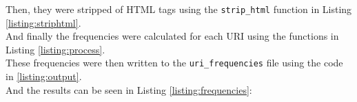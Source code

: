 \newpage

Then, they were stripped of HTML tags using the {\tt strip\_html} function in Listing \ref{listing:striphtml}.\\



And finally the frequencies were calculated for each URI using the functions in Listing \ref{listing:process}.\\



These frequencies were then written to the {\tt uri\_frequencies} file using the code in \ref{listing:output}.\\



\newpage
And the results can be seen in Listing \ref{listing:frequencies}:\\

